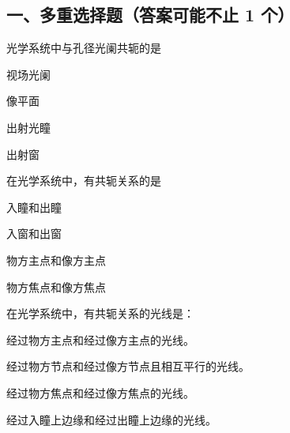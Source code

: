 \documentclass[padl, analysis, notocnum]{ExBook}
\newcommand{\answerarea}[1][3.5cm]{%
  \par\vspace{1mm}%
  \noindent{\color{themeColor!35}\rule{\linewidth}{0.4pt}}\par
  \noindent\begin{minipage}[t][#1][t]{\linewidth}\vspace{0pt}\end{minipage}\par
  \noindent{\color{themeColor!35}\rule{\linewidth}{0.4pt}}\par
}
\begin{document}
\subsection{一、多重选择题（答案可能不止 1 个）}
\begin{qitems}[startnum=1]
\qitem 光学系统中与孔径光阑共轭的是
\par\noindent\hspace{2em}视场光阑
\par\noindent\hspace{2em}像平面
\par\noindent\hspace{2em}出射光瞳
\par\noindent\hspace{2em}出射窗
\label{q:70:start}
\answerarea[4.0cm]
\label{q:70:end}
\end{qitems}

\begin{qitems}[startnum=2]
\qitem 在光学系统中，有共轭关系的是
\par\noindent\hspace{2em}入瞳和出瞳
\par\noindent\hspace{2em}入窗和出窗
\par\noindent\hspace{2em}物方主点和像方主点
\par\noindent\hspace{2em}物方焦点和像方焦点
\label{q:71:start}
\answerarea[4.0cm]
\label{q:71:end}
\end{qitems}

\begin{qitems}[startnum=3]
\qitem 在光学系统中，有共轭关系的光线是：
\par\noindent\hspace{2em}经过物方主点和经过像方主点的光线。
\par\noindent\hspace{2em}经过物方节点和经过像方节点且相互平行的光线。
\par\noindent\hspace{2em}经过物方焦点和经过像方焦点的光线。
\par\noindent\hspace{2em}经过入瞳上边缘和经过出瞳上边缘的光线。
\label{q:72:start}
\answerarea[4.0cm]
\label{q:72:end}
\end{qitems}
\end{document}
